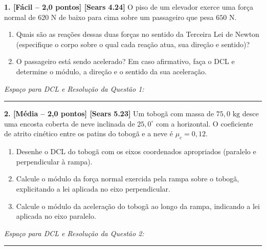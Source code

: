 \documentclass[10pt,a4paper]{article}
\begin{document}
\vspace{1.5mm}

\noindent
\textbf{1. [Fácil -- 2,0 pontos] [Sears 4.24]} O piso de um elevador exerce uma força normal de $620\text{ N}$ de baixo para cima sobre um passageiro que pesa $650\text{ N}$.
\begin{enumerate}[label=\alph*),itemsep=0pt,topsep=1pt]
    \item Quais são as reações dessas duas forças no sentido da Terceira Lei de Newton (especifique o corpo sobre o qual cada reação atua, sua direção e sentido)?
    \item O passageiro está sendo acelerado? Em caso afirmativo, faça o DCL e determine o módulo, a direção e o sentido da sua aceleração.
\end{enumerate}

\vspace{0.15cm}
\noindent\textit{\footnotesize Espaço para DCL e Resolução da Questão 1:}
\vspace{4.2cm}
\hrule
\vspace{2mm}

\noindent
\textbf{2. [Média -- 2,0 pontos] [Sears 5.23]} Um tobogã com massa de $75,0\text{ kg}$ desce uma encosta coberta de neve inclinada de $25,0^\circ$ com a horizontal. O coeficiente de atrito cinético entre os patins do tobogã e a neve é $\mu_c = 0,12$.
\begin{enumerate}[label=\alph*),itemsep=0pt,topsep=1pt]
    \item Desenhe o DCL do tobogã com os eixos coordenados apropriados (paralelo e perpendicular à rampa).
    \item Calcule o módulo da força normal exercida pela rampa sobre o tobogã, explicitando a lei aplicada no eixo perpendicular.
    \item Calcule o módulo da aceleração do tobogã ao longo da rampa, indicando a lei aplicada no eixo paralelo.
\end{enumerate}

\vspace{0.15cm}
\noindent\textit{\footnotesize Espaço para DCL e Resolução da Questão 2:}
\vspace{4.5cm}
\hrule
\vspace{2mm}
\end{document}
